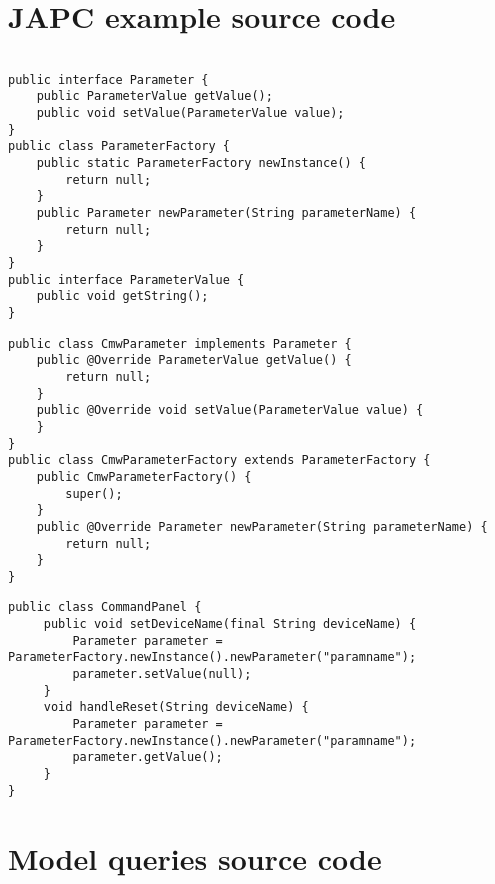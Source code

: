 \appendix
\chapter{JAPC example source code}
\label{examplesource}

\begin{lstlisting}[caption=JAPC classes (package name: cern.japc)]

public interface Parameter {
    public ParameterValue getValue();
    public void setValue(ParameterValue value);
}
public class ParameterFactory {
    public static ParameterFactory newInstance() {
        return null;
    }
    public Parameter newParameter(String parameterName) {
        return null;
    }
}
public interface ParameterValue {	
    public void getString();
}
\end{lstlisting}

\begin{lstlisting}[caption=JAPC extension classes (package name:
cern.japc.ext.cmw)]
public class CmwParameter implements Parameter {
    public @Override ParameterValue getValue() {
        return null;
    }
    public @Override void setValue(ParameterValue value) {
    }
}
public class CmwParameterFactory extends ParameterFactory {
    public CmwParameterFactory() {
        super();
    }
    public @Override Parameter newParameter(String parameterName) {    
        return null;
    }
}
\end{lstlisting}

\begin{lstlisting}[caption=Client project classes (package name:
cern.accsoft.gui.alarms)]
public class CommandPanel {
     public void setDeviceName(final String deviceName) {
         Parameter parameter = ParameterFactory.newInstance().newParameter("paramname");
         parameter.setValue(null);
     }
     void handleReset(String deviceName) {
         Parameter parameter = ParameterFactory.newInstance().newParameter("paramname");
         parameter.getValue();
     }
}
\end{lstlisting}

\chapter{Model queries source code}
\label{examplequeries}



